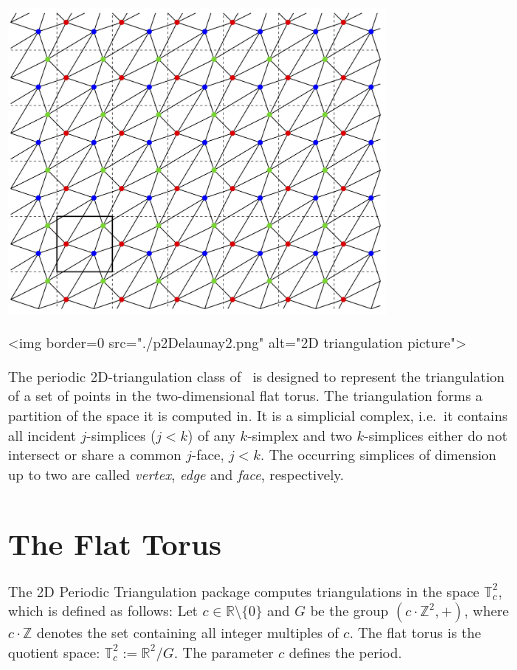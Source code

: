 %

\begin{ccTexOnly}
\begin{center}
\includegraphics[width=10cm]{Periodic_2_triangulation_2/p2Delaunay2}
\end{center}
\end{ccTexOnly}
\begin{ccHtmlOnly}
<img border=0 src="./p2Delaunay2.png" alt="2D triangulation picture">
\end{ccHtmlOnly}

The periodic 2D-triangulation class of \cgal\ is designed to represent
the triangulation of a set of points in the two-dimensional flat
torus. The triangulation forms a partition of the space it is computed
in. It is a simplicial complex, i.e.\ it contains all incident
$j$-simplices ($j<k$) of any $k$-simplex and two $k$-simplices either
do not intersect or share a common $j$-face, $j<k$. The occurring
simplices of dimension up to two are called \emph{vertex}, \emph{edge}
and \emph{face}, respectively.

\section{The Flat Torus\label{P2Triangulation2-sec-space}}
The 2D Periodic Triangulation package computes triangulations in the
space $\mathbb T_c^2$, which is defined as follows: Let $c\in\mathbb
R\setminus\{0\}$ and $G$ be the group $(c\cdot\mathbb Z^2, +)$, where
$c\cdot\mathbb Z$ denotes the set containing all integer multiples of
$c$. The flat torus is the quotient space: $\mathbb T_c^2:=\mathbb
R^2/G$. The parameter $c$ defines the period.

